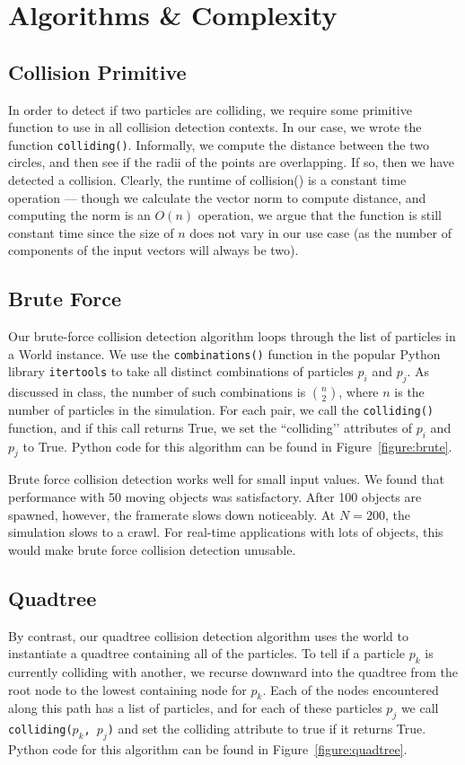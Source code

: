     \section{Algorithms \& Complexity}
      \subsection{Collision Primitive}
	In order to detect if two particles are colliding, we require
	some primitive function to use in all collision detection
	contexts. In our case, we wrote the function
	\texttt{colliding()}. Informally, we compute the distance
	between the two circles, and then see if the radii of the points
	are overlapping. If so, then we have detected a collision.
	Clearly, the runtime of collision() is a constant time operation
	--- though we calculate the vector norm to compute distance, and
	computing the norm is an $O(n)$ operation, we argue that the
	function is still constant time since the size of $n$ does not
	vary in our use case (as the number of components of the input
	vectors will always be two).

      \subsection{Brute Force}
	Our brute-force collision detection algorithm loops through the
	list of particles in a World instance. We use the
	\texttt{combinations()} function in the popular Python library
	\texttt{itertools} to take all distinct combinations of
	particles $p_i$ and $p_j$. As discussed in class, the number of
	such combinations is ${n \choose 2}$, where $n$ is the number of
	particles in the simulation. For each pair, we call the
	\texttt{colliding()} function, and if this call returns True, we
	set the ``colliding’’ attributes of $p_i$ and $p_j$ to True.
	Python code for this algorithm can be found in
	Figure~\ref{figure:brute}.

	\par Brute force collision detection works well for small input
	values. We found that performance with 50 moving objects was
	satisfactory. After 100 objects are spawned, however, the
	framerate slows down noticeably. At $N = 200$, the simulation
	slows to a crawl. For real-time applications with lots of
	objects, this would make brute force collision detection
	unusable.

      \subsection{Quadtree}
	By contrast, our quadtree collision detection algorithm uses the
	world to instantiate a quadtree containing all of the particles.
	To tell if a particle $p_k$ is currently colliding with another,
	we recurse downward into the quadtree from the root node to the
	lowest containing node for $p_k$. Each of the nodes encountered
	along this path has a list of particles, and for each of these
	particles $p_j$ we call \texttt{colliding($p_k$, $p_j$)} and set
	the colliding attribute to true if it returns True.  Python code
	for this algorithm can be found in Figure~\ref{figure:quadtree}.

